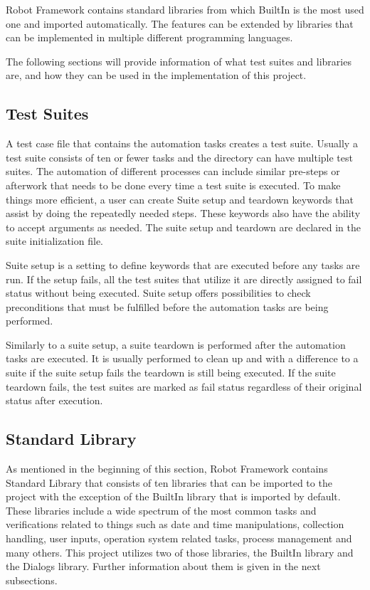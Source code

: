 Robot Framework contains standard libraries from which BuiltIn is the most used one and imported automatically.
The features can be extended by libraries that can be implemented in multiple different programming languages.

The following sections will provide information of what test suites and libraries are, and how they can be used in the implementation of this project.

\subsection{Test Suites}
A test case file that contains the automation tasks creates a test suite. Usually a test suite consists of ten or fewer tasks and the directory can have multiple test suites.
The automation of different processes can include similar pre-steps or afterwork that needs to be done every time a test suite is executed.
To make things more efficient, a user can create Suite setup and teardown keywords that assist by doing the repeatedly needed steps.
These keywords also have the ability to accept arguments as needed.
The suite setup and teardown are declared in the suite initialization file.

Suite setup is a setting to define keywords that are executed before any tasks are run.
If the setup fails, all the test suites that utilize it are directly assigned to fail status without being executed.
Suite setup offers possibilities to check preconditions that must be fulfilled before the automation tasks are being performed.

Similarly to a suite setup, a suite teardown is performed after the automation tasks are executed.
It is usually performed to clean up and with a difference to a suite if the suite setup fails the teardown is still being executed.
If the suite teardown fails, the test suites are marked as fail status regardless of their original status after execution.
\cite{robotFrameworkUserGuide:suiteSetupAndTeardown}

\subsection{Standard Library}
As mentioned in the beginning of this section, Robot Framework contains Standard Library that consists of ten libraries that can be imported to the project with the exception of the BuiltIn library that is imported by default.
These libraries include a wide spectrum of the most common tasks and verifications related to things such as date and time manipulations, collection handling, user inputs, operation system related tasks, process management and many others.
This project utilizes two of those libraries, the BuiltIn library and the Dialogs library.
Further information about them is given in the next subsections.
\cite{robotFramework:standardLibrary}

